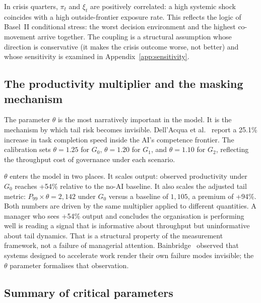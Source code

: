 \documentclass[11pt,a4paper]{article}
\begin{document}
In crisis quarters, $\pi_t$ and $\xi_t$ are positively correlated: a high
systemic shock coincides with a high outside-frontier exposure rate. This
reflects the logic of Basel~II conditional stress: the worst decision
environment and the highest co-movement arrive together. The coupling is a
structural assumption whose direction is conservative (it makes the crisis
outcome worse, not better) and whose sensitivity is examined in
Appendix~\ref{app:sensitivity}.

\subsection{The productivity multiplier and the masking mechanism}

The parameter $\theta$ is the most narratively important in the model. It is
the mechanism by which tail risk becomes invisible. Dell'Acqua et
al.~\cite{dellacqua_orgscience_2026} report a 25.1\% increase in task
completion speed inside the AI's competence frontier. The calibration sets
$\theta = 1.25$ for $G_0$, $\theta = 1.20$ for $G_1$, and $\theta = 1.10$
for $G_2$, reflecting the throughput cost of governance under each scenario.

$\theta$ enters the model in two places. It scales output: observed
productivity under $G_0$ reaches +54\% relative to the no-AI baseline. It
also scales the adjusted tail metric:
$P_{99} \times \theta = 2{,}142$ under $G_0$ versus a baseline of
$1{,}105$, a premium of +94\%. Both numbers are driven by the same
multiplier applied to different quantities. A manager who sees +54\% output
and concludes the organisation is performing well is reading a signal that
is informative about throughput but uninformative about tail dynamics. That
is a structural property of the measurement framework, not a failure of
managerial attention. Bainbridge~\cite{bainbridge_automatica_1983} observed
that systems designed to accelerate work render their own failure modes
invisible; the $\theta$ parameter formalises that observation.

\subsection{Summary of critical parameters}
\end{document}
